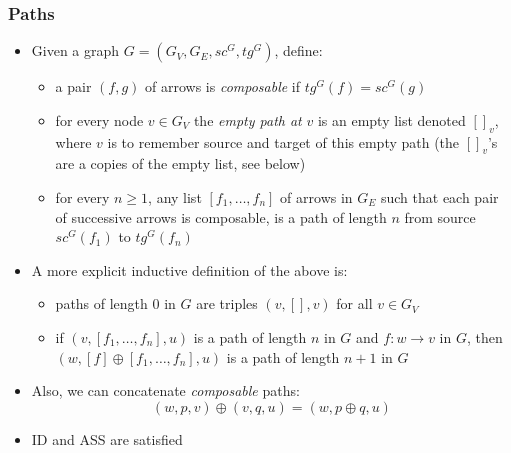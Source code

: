 \documentclass[handout]{beamer}
\begin{document}
\frame
  {   
    \frametitle{Paths}\label{Ch2:Paths}

 \begin{itemize}[<+->]
\item Given a graph $G = (G_V,G_E,sc^G, tg^G)$, define:
   \begin{itemize}[<+->]
\item a pair $(f,g)$ of arrows is \emph{composable} if $tg^G(f) = sc^G(g)$
\item for every node $v\in G_V$ the \emph{empty path at} $v$ is an empty list
denoted $[]_v$, where $v$ is to remember source and target of this empty path
(the $[]_v$'s are a copies of the empty list, see below)
\item for every $n\geq 1$, any list $[f_1,\ldots,f_n]$ of arrows in $G_E$ such that each
pair of successive arrows is composable, is a path of length $n$ from
source $sc^G(f_1)$ to $tg^G(f_n)$
   \end{itemize}
\item A more explicit inductive definition of the above is:
 \begin{itemize}[<+->]
\item paths of length 0 in $G$ are triples $(v,[],v)$ for all $v\in G_V$
\item if $(v,[f_1,\ldots,f_n],u)$ is a path of length $n$ in $G$ and $f : w\to v$ in $G$,
then $(w,[f] \oplus [f_1,\ldots,f_n],u)$ is a path of length $n+1$ in $G$
   \end{itemize}
\item Also, we can concatenate \emph{composable} paths:
\[(w,p,v)\oplus(v,q,u) = (w,p\oplus q,u)\]
\item ID and ASS are satisfied
 \end{itemize}

 }
\end{document}
